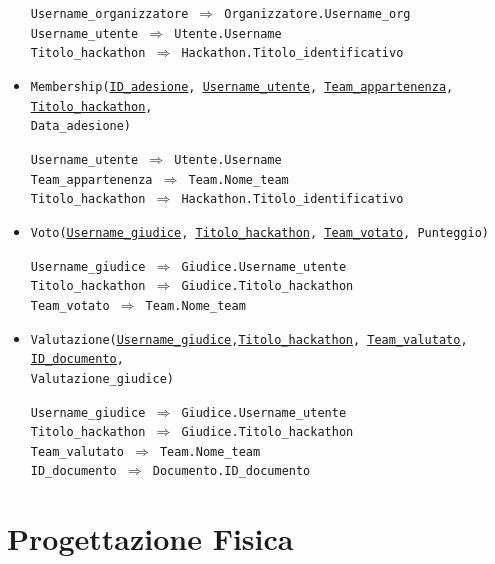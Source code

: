 \documentclass[a4paper, 10pt]{article}
\begin{document}
\begin{itemize}
		\begin{graybox}
			\texttt{Username\_organizzatore $\Rightarrow$ Organizzatore.Username\_org} \\
			\texttt{Username\_utente $\Rightarrow$ Utente.Username}\\
			\texttt{Titolo\_hackathon $\Rightarrow$ Hackathon.Titolo\_identificativo}
		\end{graybox}
		\item \texttt{Membership(\underline{ID\_adesione}, \underline{\underline{Username\_utente}}, \underline{\underline{Team\_appartenenza}}, \underline{\underline{Titolo\_hackathon}},\\Data\_adesione)}
		\begin{graybox}
			\texttt{Username\_utente $\Rightarrow$ Utente.Username}\\
			\texttt{Team\_appartenenza $\Rightarrow$ Team.Nome\_team}\\
			\texttt{Titolo\_hackathon $\Rightarrow$ Hackathon.Titolo\_identificativo}
		\end{graybox}
		\item \texttt{Voto(\underline{\underline{Username\_giudice}}, \underline{\underline{Titolo\_hackathon}}, \underline{\underline{Team\_votato}}, Punteggio)}
		\begin{graybox}
			\texttt{Username\_giudice $\Rightarrow$ Giudice.Username\_utente} \\
			\texttt{Titolo\_hackathon $\Rightarrow$ Giudice.Titolo\_hackathon} \\
			\texttt{Team\_votato $\Rightarrow$ Team.Nome\_team}
		\end{graybox}
		\item \texttt{Valutazione(\underline{\underline{Username\_giudice}},\underline{\underline{Titolo\_hackathon}}, \underline{\underline{Team\_valutato}}, \underline{\underline{ID\_documento}},\\Valutazione\_giudice)}
		\begin{graybox}
			\texttt{Username\_giudice $\Rightarrow$ Giudice.Username\_utente} \\
			\texttt{Titolo\_hackathon $\Rightarrow$ Giudice.Titolo\_hackathon} \\
			\texttt{Team\_valutato $\Rightarrow$ Team.Nome\_team} \\
			\texttt{ID\_documento $\Rightarrow$ Documento.ID\_documento}
		\end{graybox}
	\end{itemize}
	\newpage
	\section{Progettazione Fisica}
\end{document}
